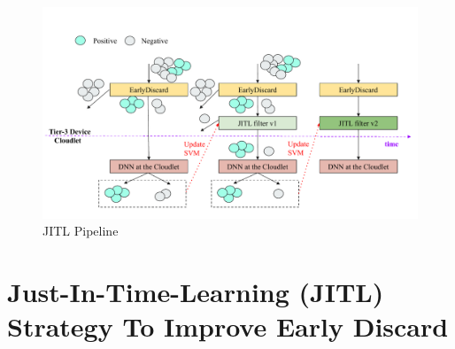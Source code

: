 
\begin{figure}
    \centering
    \includegraphics[width=\linewidth]{FIGS/fig-jitl.pdf}
    \caption{JITL Pipeline}
    \label{fig:jitl}
\end{figure}

\section{Just-In-Time-Learning (JITL) Strategy To Improve Early Discard}
\label{sec:jitl}

